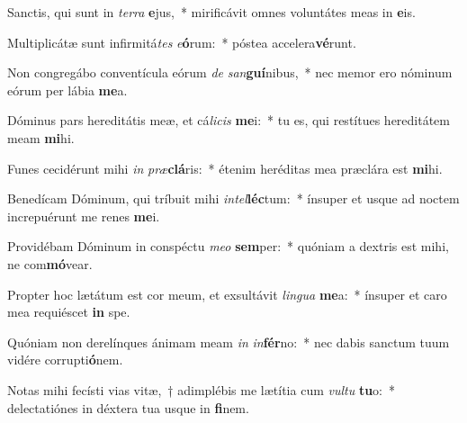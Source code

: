 \item Sanctis, qui sunt in \textit{ter}\textit{ra} \textbf{e}jus,~* mirificávit omnes voluntátes meas in \textbf{e}is.
\item Multiplicátæ sunt infirmitá\textit{tes} \textit{e}\textbf{ó}rum:~* póstea accelera\textbf{vé}runt.
\item Non congregábo conventícula eórum \textit{de} \textit{san}\textbf{guí}nibus,~* nec memor ero nóminum eórum per lábia \textbf{me}a.
\item Dóminus pars hereditátis meæ, et cá\textit{li}\textit{cis} \textbf{me}i:~* tu es, qui restítues hereditátem meam \textbf{mi}hi.
\item Funes cecidérunt mihi \textit{in} \textit{præ}\textbf{clá}ris:~* étenim heréditas mea præclára est \textbf{mi}hi.
\item Benedícam Dóminum, qui tríbuit mihi \textit{in}\textit{tel}\textbf{léc}tum:~* ínsuper et usque ad noctem increpuérunt me renes \textbf{me}i.
\item Providébam Dóminum in conspéctu \textit{me}\textit{o} \textbf{sem}per:~* quóniam a dextris est mihi, ne com\textbf{mó}vear.
\item Propter hoc lætátum est cor meum, et exsultávit \textit{lin}\textit{gua} \textbf{me}a:~* ínsuper et caro mea requiéscet \textbf{in} spe.
\item Quóniam non derelínques ánimam meam \textit{in} \textit{in}\textbf{fér}no:~* nec dabis sanctum tuum vidére corrupti\textbf{ó}nem.
\item Notas mihi fecísti vias vitæ,~† adimplébis me lætítia cum \textit{vul}\textit{tu} \textbf{tu}o:~* delectatiónes in déxtera tua usque in \textbf{fi}nem.
